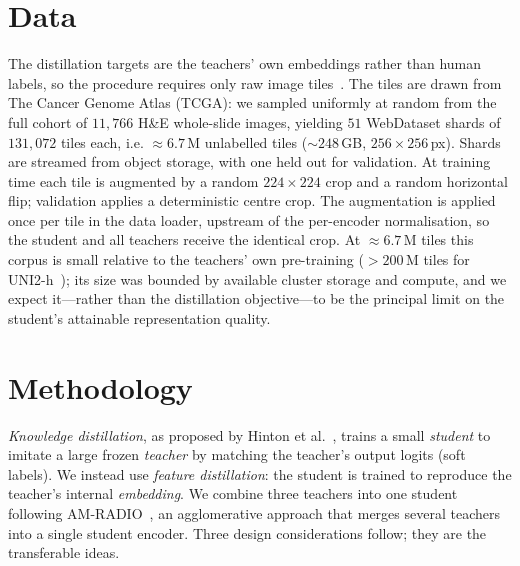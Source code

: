 \documentclass[10pt]{article}
\begin{document}
\section{Data}

The distillation targets are the teachers' own embeddings rather than human labels, so the
procedure requires only raw image tiles~\cite{radio}. The tiles are drawn from The Cancer Genome
Atlas (TCGA): we sampled uniformly at random from the full cohort of $11{,}766$ H\&E whole-slide
images, yielding $51$ WebDataset shards of $131{,}072$ tiles each, i.e. ${\approx}6.7$\,M
unlabelled tiles (${\sim}248$\,GB, $256\times256$\,px). Shards are streamed from object storage,
with one held out for validation. At training time each tile is augmented by a random
$224\times224$ crop and a random horizontal flip; validation applies a deterministic centre crop.
The augmentation is applied once per tile in the data loader, upstream of the per-encoder
normalisation, so the student and all teachers receive the identical crop. At ${\approx}6.7$\,M
tiles this corpus is small relative to the teachers' own pre-training (${>}200$\,M tiles for
UNI2-h~\cite{uni}); its size was bounded by available cluster storage and compute, and we expect
it—rather than the distillation objective—to be the principal limit on the student's attainable
representation quality.

\section{Methodology}

\emph{Knowledge distillation}, as proposed by Hinton et al.~\cite{hinton}, trains a small
\emph{student} to imitate a large frozen \emph{teacher} by matching the teacher's output
logits (soft labels). We instead use \emph{feature distillation}: the student is trained to
reproduce the teacher's internal \emph{embedding}. We combine three teachers into one student
following AM-RADIO~\cite{radio}, an agglomerative approach that merges several teachers into a
single student encoder. Three design considerations follow; they are the transferable ideas.
\end{document}
